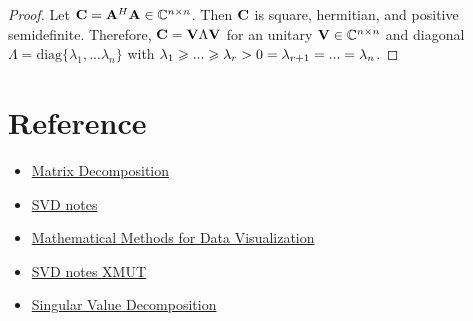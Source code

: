 \begin{proof}
    Let $\bold{C}=\bold{A}^H\bold{A}\in \mathbb{C}^{n\times n}$. Then $\bold{C}$ is square, hermitian, and positive semidefinite.
    Therefore, $\bold{C}=\bold{V}\Lambda\bold{V}$ for an unitary $\bold{V}\in \mathbb{C}^{n\times n}$
    and diagonal $\Lambda=\text{diag} \{\lambda_1,...\lambda_n\}$ with $\lambda_1\geqslant ...\geqslant \lambda_r>0=\lambda_{r+1}=...=\lambda_n$.
    
\end{proof}

\section{Reference}

\begin{itemize}
    \item \href{http://users.ece.northwestern.edu/~mya671/files/Matrix_YM_.pdf}{Matrix Decomposition}
    \item \href{https://math.berkeley.edu/~hutching/teach/54-2017/svd-notes.pdf}{SVD notes}
    \item \href{https://www.sjsu.edu/faculty/guangliang.chen/Math253S20.html}{Mathematical Methods for Data Visualization}
    \item \href{https://kuidu.github.io/nla/nla02.pdf}{SVD notes XMUT}
    \item \href{https://people.cas.uab.edu/~mosya/teaching/660new3.pdf}{Singular Value Decomposition}
\end{itemize}